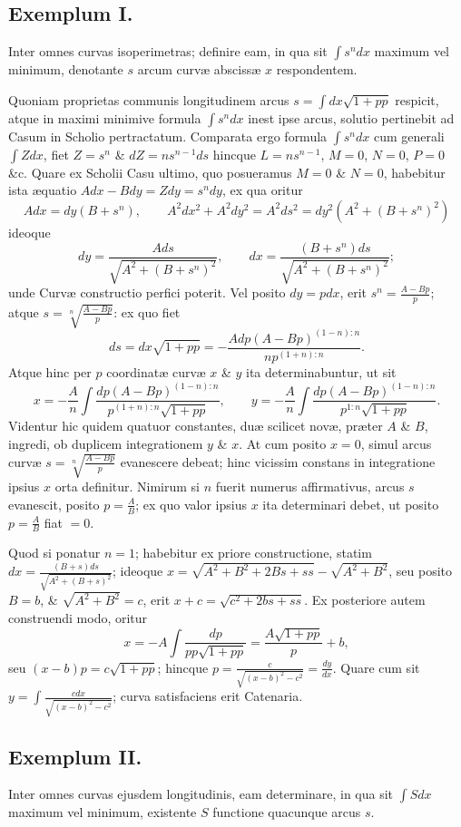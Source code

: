 \subsection*{Exemplum I.}
Inter omnes curvas isoperimetras; definire eam, in qua sit $\int s^n dx$ maximum vel minimum, denotante $s$ arcum curvæ abscissæ $x$ respondentem.

Quoniam proprietas communis longitudinem arcus $s=\int dx\sqrt{1+pp}$ respicit, atque in maximi minimive formula $\int s^n dx$ inest ipse arcus, solutio pertinebit ad Casum in Scholio pertractatum. Comparata ergo formula $\int s^n dx$ cum generali $\int Zdx$, fiet $Z=s^n$ \& $dZ=ns^{n-1}ds$ hincque $L=ns^{n-1}$, $M=0$, $N=0$, $P=0$ \&c. Quare ex Scholii Casu ultimo, quo posueramus $M=0$ \& $N=0$, habebitur ista æquatio $Adx-Bdy=Zdy=s^n dy$, ex qua oritur
\[
Adx=dy(B+s^n),\qquad A^2dx^2+A^2dy^2=A^2ds^2=dy^2(A^2+(B+s^n)^2)
\]
ideoque
\[dy=\frac{Ads}{\sqrt{A^2+(B+s^n)^2}},\qquad dx=\frac{(B+s^n)ds}{\sqrt{A^2+(B+s^n)^2}};\]
unde Curvæ constructio perfici poterit. Vel posito $dy=pdx$, erit $s^n=\frac{A-Bp}p$; atque $s=\sqrt[n]{\frac{A-Bp}p}$: ex quo fiet
\[ds=dx\sqrt{1+pp}=-\frac{Adp(A-Bp)^{(1-n):n}}{np^{(1+n):n}}.\]
Atque hinc per $p$ coordinatæ curvæ $x$ \& $y$ ita determinabuntur, ut sit
\[
x=-\frac An\int\frac{dp(A-Bp)^{(1-n):n}}{p^{(1+n):n}\sqrt{1+pp}},\qquad
y=-\frac An\int\frac{dp(A-Bp)^{(1-n):n}}{p^{1:n}\sqrt{1+pp}}.
\]
Videntur hic quidem quatuor constantes, duæ scilicet novæ, præter $A$ \& $B$, ingredi, ob duplicem integrationem $y$ \& $x$. At cum posito $x=0$, simul arcus curvæ $s=\sqrt[n]{\frac{A-Bp}p}$ evanescere debeat; hinc vicissim constans in integratione ipsius $x$ orta definitur. Nimirum si $n$ fuerit numerus affirmativus, arcus $s$ evanescit, posito $p=\frac AB$; ex quo valor ipsius $x$ ita determinari debet, ut posito $p=\frac AB$ fiat $=0$.

Quod si ponatur $n=1$; habebitur ex priore constructione, statim $dx=\frac{(B+s)ds}{\sqrt{A^2+(B+s)^2}}$; ideoque $x=\sqrt{A^2+B^2+2Bs+ss}-\sqrt{A^2+B^2}$, seu posito $B=b$, \& $\sqrt{A^2+B^2}=c$, erit $x+c=\sqrt{c^2+2bs+ss}$. Ex posteriore autem construendi modo, oritur
\[x=-A\int\frac{dp}{pp\sqrt{1+pp}}=\frac{A\sqrt{1+pp}}p+b,\]
seu $(x-b)p=c\sqrt{1+pp}$; hincque $p=\frac c{\sqrt{(x-b)^2-c^2}}=\frac{dy}{dx}$. Quare cum sit $y=\int\frac{cdx}{\sqrt{(x-b)^2-c^2}}$; curva satisfaciens erit Catenaria.

\subsection*{Exemplum II.}
Inter omnes curvas ejusdem longitudinis, eam determinare, in qua sit $\int Sdx$ maximum vel minimum, existente $S$ functione quacunque arcus $s$.

